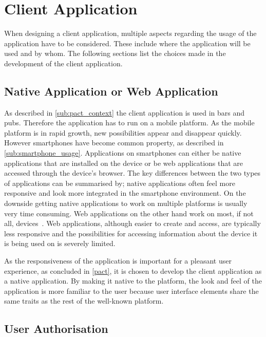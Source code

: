 \section{Client Application}
\label{ssub:client_application}

When designing a client application, multiple aspects regarding the usage of the application have to be considered. These include where the application will be used and by whom. The following sections list the choices made in the development of the client application.

\subsection{Native Application or Web Application}
\label{par:native_application_or_web_application}

As described in \cref{sub:pact_context} the client application is used in bars and pubs. Therefore the application has to run on a mobile platform. As the mobile platform is in rapid growth, new possibilities appear and disappear quickly. However smartphones have become common property, as described in \cref{sub:smartphone_usage}. Applications on smartphones can either be native applications that are installed on the device or be web applications that are accessed through the device's browser. The key differences between the two types of applications can be summarised by; native applications often feel more responsive and look more integrated in the smartphone environment. On the downside  getting native applications to work on multiple platforms is usually very time consuming. Web applications on the other hand work on most, if not all, devices~\cite{charland2011mobile}. Web applications, although easier to create and access, are typically less responsive and the possibilities for accessing information about the device it is being used on is severely limited.

As the responsiveness of the application is important for a pleasant user experience, as concluded in \cref{pact}, it is chosen to develop the client application as a native application. By making it native to the platform, the look and feel of the application is more familiar to the user because user interface elements share the same traits as the rest of the well-known platform.

\subsection{User Authorisation}
\label{par:user_authorization}

